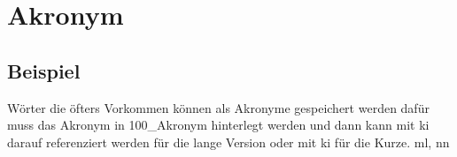 \chapter{Akronym}

\section{Beispiel}
Wörter die öfters Vorkommen können als Akronyme gespeichert werden dafür muss das Akronym in 100\_Akronym hinterlegt werden und dann kann mit \acrlong{ki} darauf referenziert werden für die lange Version oder mit \acrshort{ki} für die Kurze. \acrshort{ml}, \acrshort{nn}

